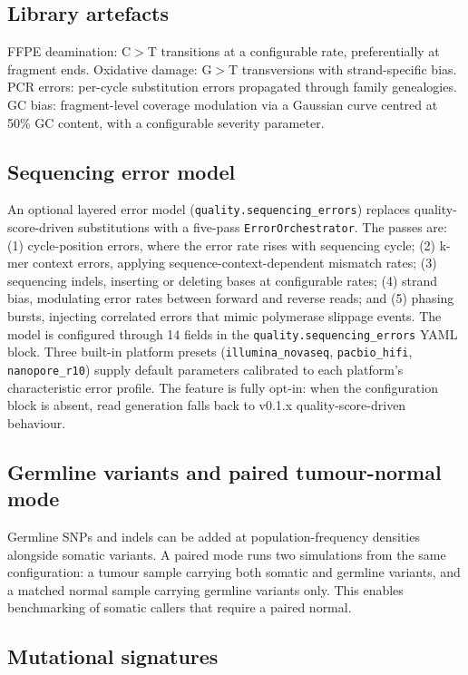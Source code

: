\subsection{Library artefacts}

FFPE deamination: C$>$T transitions at a configurable rate, preferentially at fragment ends.
Oxidative damage: G$>$T transversions with strand-specific bias.
PCR errors: per-cycle substitution errors propagated through family genealogies.
GC bias: fragment-level coverage modulation via a Gaussian curve centred at 50\% GC content, with a configurable severity parameter.

\subsection{Sequencing error model}

An optional layered error model (\texttt{quality.sequencing\_errors}) replaces quality-score-driven substitutions with a five-pass \texttt{ErrorOrchestrator}.
The passes are: (1) cycle-position errors, where the error rate rises with sequencing cycle; (2) k-mer context errors, applying sequence-context-dependent mismatch rates; (3) sequencing indels, inserting or deleting bases at configurable rates; (4) strand bias, modulating error rates between forward and reverse reads; and (5) phasing bursts, injecting correlated errors that mimic polymerase slippage events.
The model is configured through 14 fields in the \texttt{quality.sequencing\_errors} YAML block.
Three built-in platform presets (\texttt{illumina\_novaseq}, \texttt{pacbio\_hifi}, \texttt{nanopore\_r10}) supply default parameters calibrated to each platform's characteristic error profile.
The feature is fully opt-in: when the configuration block is absent, read generation falls back to v0.1.x quality-score-driven behaviour.

\subsection{Germline variants and paired tumour-normal mode}

Germline SNPs and indels can be added at population-frequency densities alongside somatic variants.
A paired mode runs two simulations from the same configuration: a tumour sample carrying both somatic and germline variants, and a matched normal sample carrying germline variants only.
This enables benchmarking of somatic callers that require a paired normal.

\subsection{Mutational signatures}

